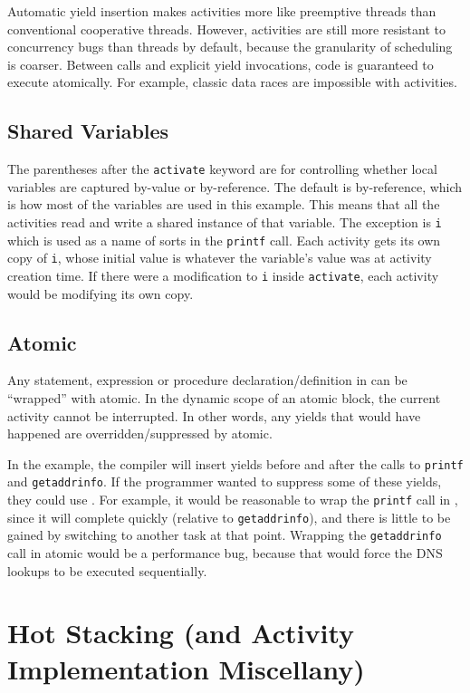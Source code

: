 \documentclass[acmsmall,anonymous,review]{acmart}\settopmatter{printfolios=true,printccs=false,printacmref=false}
\begin{document}
Automatic yield insertion makes activities more like preemptive threads than conventional cooperative threads.
However, activities are still more resistant to concurrency bugs than threads by default, because the granularity of scheduling is coarser.
Between calls and explicit yield invocations, code is guaranteed to execute atomically.
For example, classic data races are impossible with activities.


\subsection{Shared Variables}

The parentheses after the \texttt{activate} keyword are for controlling whether local variables are captured by-value or by-reference.
The default is by-reference, which is how most of the variables are used in this example.
This means that all the activities read and write a shared instance of that variable.
The exception is \texttt{i} which is used as a name of sorts in the \texttt{printf} call.
Each activity gets its own copy of \texttt{i}, whose initial value is whatever the variable's value was at activity creation time.
If there were a modification to \texttt{i} inside \texttt{activate}, each activity would be modifying its own copy.

\subsection{Atomic}
\label{sec:atomic}

Any statement, expression or procedure declaration/definition in \charcoal{} can be ``wrapped'' with atomic.
In the dynamic scope of an atomic block, the current activity cannot be interrupted.
In other words, any yields that would have happened are overridden/suppressed by atomic.

In the example, the compiler will insert yields before and after the calls to \texttt{printf} and \texttt{getaddrinfo}.
If the programmer wanted to suppress some of these yields, they could use \atomic{}.
For example, it would be reasonable to wrap the \texttt{printf} call in \atomic{}, since it will complete quickly (relative to \texttt{getaddrinfo}), and there is little to be gained by switching to another task at that point.
Wrapping the \texttt{getaddrinfo} call in atomic would be a performance bug, because that would force the DNS lookups to be executed sequentially.

\section{Hot Stacking (and Activity Implementation Miscellany)}
\end{document}
